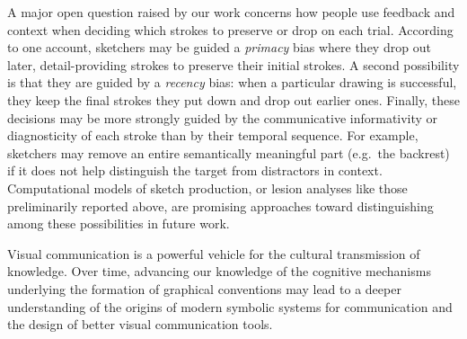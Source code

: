 \documentclass[10pt,letterpaper]{article}
\newcommand{\ndg}[1]{{\textcolor{Green}{[ndg: #1]}}}
\newcommand{\rdh}[1]{\textcolor{Red}{rdh: #1}}
\begin{document}
A major open question raised by our work concerns how people use feedback and context when deciding which strokes to preserve or drop on each trial.
According to one account, sketchers may be guided a \emph{primacy} bias where they drop out later, detail-providing strokes to preserve their initial strokes.
A second possibility is that they are guided by a \emph{recency} bias: when a particular drawing is successful, they keep the final strokes they put down and drop out earlier ones.
Finally, these decisions may be more strongly guided by the communicative informativity or diagnosticity of each stroke than by their temporal sequence.
For example, sketchers may remove an entire semantically meaningful part (e.g.~the backrest) if it does not help distinguish the target from distractors in context. %
Computational models of sketch production, or lesion analyses like those preliminarily reported above, are promising approaches toward distinguishing among these possibilities in future work.%

Visual communication is a powerful vehicle for the cultural transmission of knowledge.
Over time, advancing our knowledge of the cognitive mechanisms underlying the formation of graphical conventions
may lead to a deeper understanding of the origins of modern symbolic systems for communication and the design of better visual communication tools.
\end{document}

